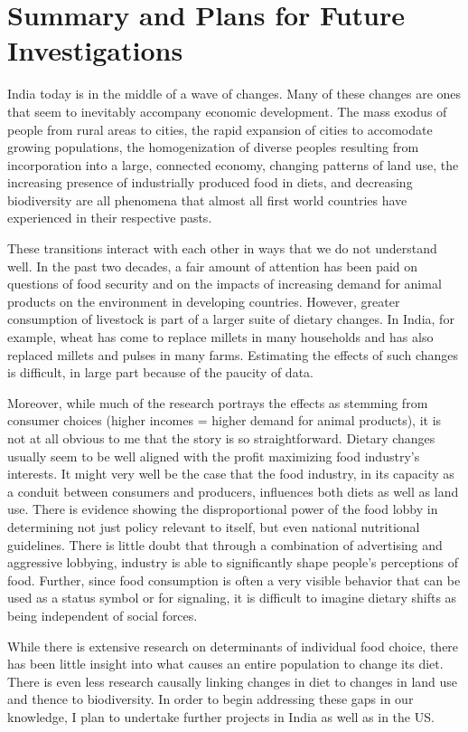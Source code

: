 \documentclass[report.tex]{subfiles}
\begin{document}
\chapter{Summary and Plans for Future Investigations}

India today is in the middle of a wave of changes. Many of these changes are ones that seem to inevitably accompany economic development. The mass exodus of people from rural areas to cities, the rapid expansion of cities to accomodate growing populations, the homogenization of diverse peoples resulting from incorporation into a large, connected economy, changing patterns of land use, the increasing presence of industrially produced food in diets, and decreasing biodiversity are all phenomena that almost all first world countries have experienced in their respective pasts.

These transitions interact with each other in ways that we do not understand well. In the past two decades, a fair amount of attention has been paid on questions of food security and on the impacts of increasing demand for animal products on the environment in developing countries. However, greater consumption of livestock is part of a larger suite of dietary changes. In India, for example, wheat has come to replace millets in many households and has also replaced millets and pulses in many farms. Estimating the effects of such changes is difficult, in large part because of the paucity of data.

Moreover, while much of the research portrays the effects as stemming from consumer choices (higher incomes = higher demand for animal products), it is not at all obvious to me that the story is so straightforward. Dietary changes usually seem to be well aligned with the profit maximizing food industry's interests. It might very well be the case that the food industry, in its capacity as a conduit between consumers and producers, influences both diets as well as land use. There is evidence showing the disproportional power of the food lobby in determining not just policy relevant to itself, but even national nutritional guidelines. There is little doubt that through a combination of advertising and aggressive lobbying, industry is able to significantly shape people's perceptions of food. Further, since food consumption is often a very visible behavior that can be used as a status symbol or for signaling, it is difficult to imagine dietary shifts as being independent of social forces.

While there is extensive research on determinants of individual food choice, there has been little insight into what causes an entire population to change its diet. There is even less research causally linking changes in diet to changes in land use and thence to biodiversity. In order to begin addressing these gaps in our knowledge, I plan to undertake further projects in India as well as in the US.
\end{document}
